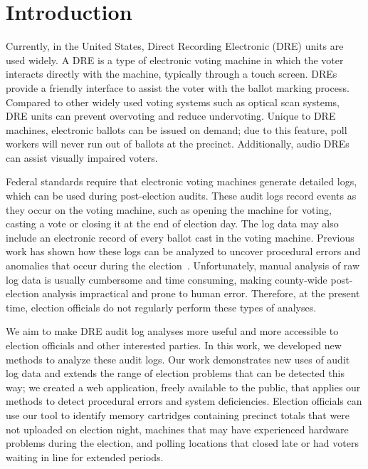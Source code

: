 \section{Introduction}

Currently, in the United States, Direct Recording Electronic (DRE) units are used widely. A DRE is a type of electronic voting machine in which the voter interacts directly with the machine, typically through a touch screen. DREs provide a friendly interface to assist the voter with the ballot marking process. Compared to other widely used voting systems such as optical scan systems, DRE units can prevent overvoting and reduce undervoting. Unique to DRE machines, electronic ballots can be issued on demand; due to this feature, poll workers will never run out of ballots at the precinct.  Additionally, audio DREs can assist visually impaired voters.
 
Federal standards require that electronic voting machines generate detailed logs, which can be used during post-election audits. These audit logs record events as they occur on the voting machine, such as opening the machine for voting, casting a vote or closing it at the end of election day. The log data may also include an electronic record of every ballot cast in the voting machine.  Previous work has shown how these logs can be analyzed to uncover procedural errors and anomalies that occur during the election~\cite{Buell2011}.  Unfortunately, manual analysis of raw log data is usually cumbersome and time consuming, making county-wide post-election analysis impractical and prone to human error. Therefore, at the present time, election officials do not regularly perform these types of analyses. 

We aim to make DRE audit log analyses more useful and more accessible to election officials and other interested parties. In this work, we developed new methods to analyze these audit logs. Our work demonstrates new uses of audit log data and extends the range of election problems that can be detected this way; we created a web application, freely available to the public, that applies our methods to detect procedural errors and system deficiencies.  Election officials can use our tool to identify memory cartridges containing precinct totals that were not uploaded on election night, machines that may have experienced hardware problems during the election, and polling locations that closed late or had voters waiting in line for extended periods.
 
